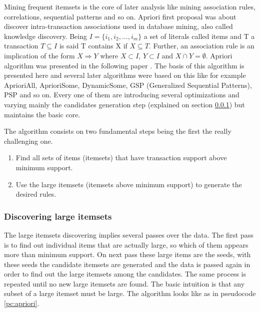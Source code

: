 Mining frequent itemsets is the core of later analysis like mining association
rules, correlations, sequential patterns and so on. Apriori first proposal was
about discover intra-transaction associations used
in database mining, also called knowledge discovery.
Being $I=\{i_{1}, i_{2}, \dots,i_{m}\}$ a set of literals called items and T a
transaction $T \subseteq I$ is said T contains X if $X \subseteq T$. Further, an
association rule is an implication of the form $X \Rightarrow Y$ where $X
\subset I$, $Y \subset I$ and $X \cap Y = \emptyset$. Apriori algorithm was
presented in the following paper \cite{agrawalfast}. The basis of this algorithm
is presented here and several later algorithms were based on this like for
example AprioriAll, AprioriSome, DynamicSome, GSP (Generalized Sequential
Patterns), PSP and so on. Every one of them are introducing several
optimizations and varying mainly the candidates generation step (explained on
section \ref{ss:discovering_large_itemsets}) but maintains 
the basic core.

The algorithm consists on two fundamental steps being the first the really
challenging one.
\begin{enumerate}
  \item Find all sets of items (itemsets) that have transaction support above
    minimum support.
  \item Use the large itemsets (itemsets above minimum support) to generate the
    desired rules.
\end{enumerate}

\subsubsection{Discovering large itemsets}\label{ss:discovering_large_itemsets}

The large itemsets discovering implies several passes over the data. The first
pass is to find out individual items that are actually large, so which of them
appears more than minimum support. 
On next pass these large items are the seeds, with these
seeds the candidate itemsets are generated and the data is passed again in order 
to find out the large itemsets among the candidates. The same process is repeated 
until no new large itemsets are found. The basic intuition is that any subset of
a large itemset must be large. The algorithm looks like as in pseudocode
\ref{pc:apriori}.

